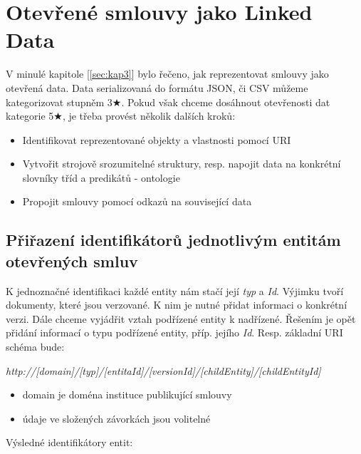 \chapter{Otevřené smlouvy jako Linked Data}
\label{sec:kap4}

V minulé kapitole [\ref{sec:kap3}] bylo řečeno, jak reprezentovat smlouvy jako otevřená data. Data serializovaná do formátu JSON, či CSV můžeme kategorizovat stupněm 3$\bigstar$. Pokud však chceme dosáhnout otevřenosti dat kategorie 5$\bigstar$, je třeba provést několik dalších kroků:

\begin{itemize}
\item Identifikovat reprezentované objekty a vlastnosti pomocí URI
\item Vytvořit strojově srozumitelné struktury, resp. napojit data na konkrétní slovníky tříd a predikátů - ontologie
\item Propojit smlouvy pomocí odkazů na související data
\end{itemize}

\section{Přiřazení identifikátorů jednotlivým entitám otevřených smluv}

K jednoznačné identifikaci každé entity nám stačí její \textit{typ} a \textit{Id}. Výjimku tvoří dokumenty, které jsou verzované. K nim je nutné přidat informaci o konkrétní verzi. Dále chceme vyjádřit vztah podřízené entity k nadřízené. Řešením je opět přidání informací o typu podřízené entity, příp. jejího \textit{Id}. Resp. základní URI schéma bude:

\bigskip

\textit{http://[domain]/[typ]/[entitaId]/{[versionId]}/{[childEntity]}/{[childEntityId]}}
\begin{itemize}
\item domain je doména instituce publikující smlouvy
\item údaje ve složených závorkách jsou volitelné
\end{itemize}

\medskip
\noindent
Výsledné identifikátory entit:

